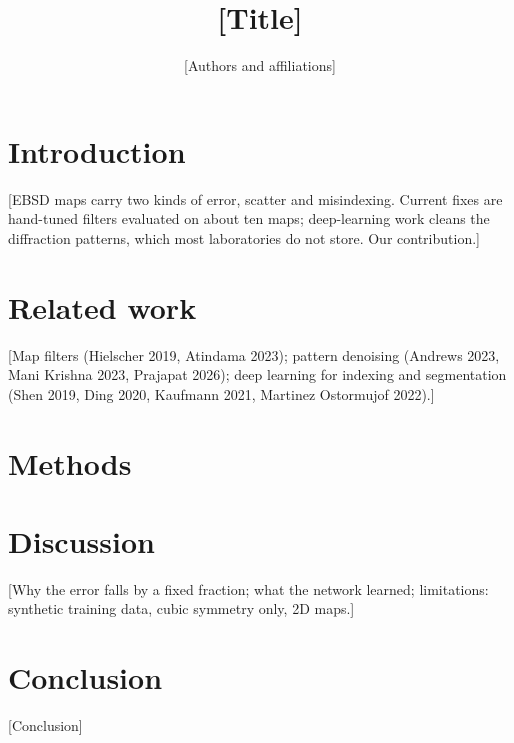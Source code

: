 \documentclass[10pt,twocolumn]{article}
\title{[Title]}
\author{[Authors and affiliations]}
\date{}
\begin{document}
\maketitle

\begin{abstract}

\end{abstract}

\section{Introduction}
[EBSD maps carry two kinds of error, scatter and misindexing. Current fixes are
hand-tuned filters evaluated on about ten maps; deep-learning work cleans the
diffraction patterns, which most laboratories do not store. Our contribution.]

\section{Related work}
[Map filters (Hielscher 2019, Atindama 2023); pattern denoising (Andrews 2023,
Mani Krishna 2023, Prajapat 2026); deep learning for indexing and segmentation
(Shen 2019, Ding 2020, Kaufmann 2021, Martinez Ostormujof 2022).]

\section{Methods}







\section{Discussion}
[Why the error falls by a fixed fraction; what the network learned;
limitations: synthetic training data, cubic symmetry only, 2D maps.]

\section{Conclusion}
[Conclusion]

\clearpage
\appendix

\clearpage



\end{document}
